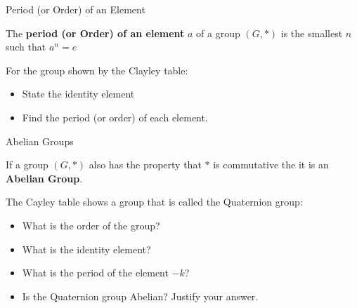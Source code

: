 \documentclass[8pt]{beamer}
\begin{document}
\begin{frame}{Period (or Order) of an Element}
	\begin{definition}
		The \textbf{period (or Order) of an element} $a$ of a group  $(G,*)$ is the smallest  $n$ such that  $a^n=e$ 
	\end{definition}

	\begin{Problem}
For the group shown by the Clayley table:
\begin{itemize}
	\item State the identity element
	\item Find the period (or order) of each element.
\end{itemize}
	\end{Problem}


\end{frame}


\begin{frame}{Abelian Groups}
	\begin{definition}
		If a group $(G,*)$ also has the property that  $*$ is commutative the it is an  \textbf{Abelian Group}.
	\end{definition}

\begin{Problem}
	The Cayley table shows a group that is called the Quaternion group:
	\begin{itemize}
		\item What is the order of the group?
		\item What is the identity element?
		\item What is the period of the element $-k$?
		\item Is the Quaternion group Abelian? Justify your answer.
	\end{itemize}
\end{Problem}

\end{frame}
\end{document}
